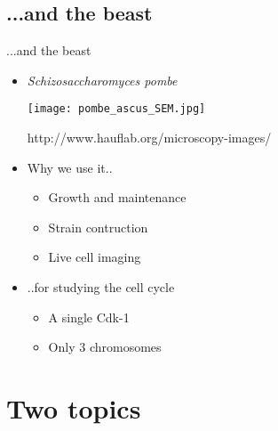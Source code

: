 \subsection{...and the beast}
\begin{frame}{...and the beast}

\begin{itemize}
\item{ \it Schizosaccharomyces pombe }
\begin{center}
\texttt{[image: pombe\_ascus\_SEM.jpg]}

\tiny{http://www.hauflab.org/microscopy-images/}
\end{center}
\item Why we use it..
\begin{itemize}
\item Growth and maintenance
\item Strain contruction
\item Live cell imaging
\end{itemize}
\item ..for studying the cell cycle
\begin{itemize}
\uncover \item A single Cdk-1
\item Only 3 chromosomes
\end{itemize}
\end{itemize}

\end{frame}

\section{Two topics}
